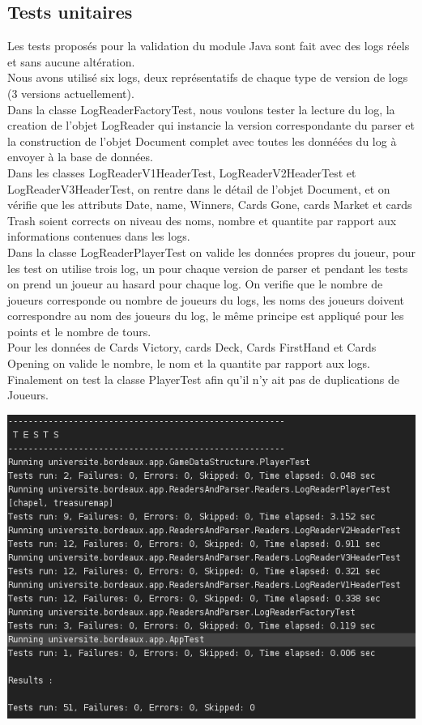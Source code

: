 \subsection{Tests unitaires}

Les tests proposés pour la validation du module Java sont fait avec des logs réels et sans aucune altération.\\
Nous avons utilisé six logs, deux représentatifs de chaque type de version de logs (3 versions actuellement). \\

Dans la classe LogReaderFactoryTest, nous voulons tester la lecture du log, la creation de l'objet LogReader qui instancie la version correspondante du parser et la construction de l'objet Document complet avec toutes les donnéées du log à envoyer à la base de données. \\

Dans les classes LogReaderV1HeaderTest, LogReaderV2HeaderTest et LogReaderV3HeaderTest, on rentre dans le détail de l'objet Document, et on vérifie que les attributs Date, name, Winners, Cards Gone, cards Market et cards Trash soient corrects on niveau des noms, nombre et quantite par rapport aux informations contenues dans les logs. \\

Dans la classe LogReaderPlayerTest on valide les données propres du joueur, pour les test on utilise trois log, un pour chaque version de parser et pendant les tests on prend un joueur au hasard pour chaque log. On verifie que le nombre de joueurs corresponde ou nombre de joueurs du logs, les noms des joueurs doivent correspondre au nom des joueurs du log, le même principe est appliqué pour les points et le nombre de tours. \\
Pour les données de Cards Victory, cards Deck, Cards FirstHand et Cards Opening on valide le nombre, le nom et la quantite par rapport aux logs. \\

Finalement on test la classe PlayerTest afin qu'il n'y ait pas de duplications de Joueurs.

\includegraphics[scale=0.35,keepaspectratio]{./unit_tests_jave}

